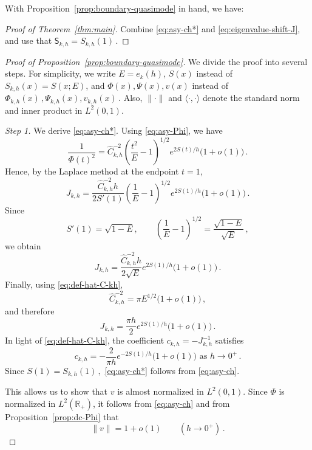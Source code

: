 \documentclass[11pt]{amsart}
\numberwithin{equation}{section}
\theoremstyle{remark}
\newcommand{\R}{\mathbb{R}}
\begin{document}
With Proposition~\ref{prop:boundary-quasimode} in hand, we have:

\begin{proof}[Proof of Theorem~\ref{thm:main}]
Combine \eqref{eq:asy-ch*} and \eqref{eq:eigenvalue-shift-J}, and use that $\mathsf S_{k,h}=S_{k,h}(1)$\,.
\end{proof}


\begin{proof}[Proof of Proposition~\ref{prop:boundary-quasimode}]
	We divide the proof into several steps. For simplicity, we write $E=e_k(h)$, $S(x)$ instead of $S_{k,h}(x)=S(x;E)$, and $\Phi(x),\Psi(x),v(x)$ instead of $\Phi_{k,h}(x)\,,\Psi_{k,h}(x),v_{k,h}(x)\,$. Also, $\|\cdot\|$ and $\langle\cdot,\cdot\rangle$ denote the standard norm and inner product in $L^2(0,1).$
	
	\medskip
	\noindent
	\emph{Step 1.} We derive \eqref{eq:asy-ch*}. 
	Using \eqref{eq:asy-Phi}, we have
	\[
	\frac{1}{\Phi(t)^2}
	=
	\hat C_{k,h}^{-2}
	\left(\frac{t^2}{E}-1\right)^{1/2}
	e^{2S(t)/h}
	\bigl(1+o(1)\bigr)\,.
	\]
	Hence, by the Laplace method at the endpoint $t=1$,
	\[
	J_{k,h}
	=
	\frac{\hat C_{k,h}^{-2}h}{2S'(1)}
	\left(\frac{1}{E}-1\right)^{1/2}
	e^{2S(1)/h}
	\bigl(1+o(1)\bigr)\,.
	\]
	Since
	\[
	S'(1)=\sqrt{1-E},
	\qquad
	\left(\frac{1}{E}-1\right)^{1/2}
	=
	\frac{\sqrt{1-E}}{\sqrt E}\,,
	\]
	we obtain
	\[
	J_{k,h}
	=
	\frac{\hat C_{k,h}^{-2}h}{2\sqrt E}
	e^{2S(1)/h}
	\bigl(1+o(1)\bigr)\,.
	\]
	Finally, using \eqref{eq:def-hat-C-kh},
	\[
	\hat C_{k,h}^{-2}
	=
	\pi E^{1/2}\bigl(1+o(1)\bigr)\,,
	\]
	and therefore
	\[
	J_{k,h}
	=
	\frac{\pi h}{2}
	e^{2S(1)/h}
	\bigl(1+o(1)\bigr)\,.
	\]
%
In light of \eqref{eq:def-hat-C-kh}, the coefficient $c_{k,h}=-J_{k,h}^{-1}$ satisfies
\begin{equation}\label{eq:asy-ch}
c_{k,h}=
	-\frac{2}{\pi h}
	e^{-2S(1)/h}
	\bigl(1+o(1)\bigr)
\mbox{ as } h\to 0^+\,.
\end{equation}
%
Since $S(1)=S_{k,h}(1)\,,$ \eqref{eq:asy-ch*} follows from \eqref{eq:asy-ch}. 
%

This allows us to show that $v$ is almost normalized in $L^2(0,1)$. Since $\Phi$ is normalized in $L^2(\R_+)$, it follows from \eqref{eq:asy-ch} and from Proposition~\ref{prop:dc-Phi}  that
\begin{equation}\label{eq:norm-vh}
\|v\|=1+o(1)\qquad(h\to0^+)\,.
\end{equation}


\end{proof}
\end{document}
